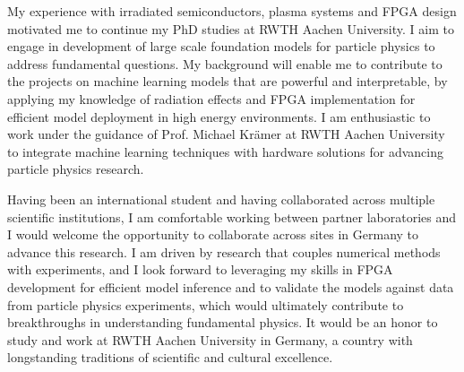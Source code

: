 \documentclass[a4paper,12pt]{article}
\begin{document}
\vspace{5pt}

My experience with irradiated semiconductors, plasma systems and FPGA design motivated me to continue my PhD studies at RWTH Aachen University. I aim to engage in development of large scale foundation models for particle physics to address fundamental questions. My background will enable me to contribute to the projects on machine learning models that are powerful and interpretable, by applying my knowledge of radiation effects and FPGA implementation for efficient model deployment in high energy environments. I am enthusiastic to work under the guidance of Prof. Michael Krämer at RWTH Aachen University to integrate machine learning techniques with hardware solutions for advancing particle physics research.

\vspace{5pt}

Having been an international student and having collaborated across multiple scientific institutions, I am comfortable working between partner laboratories and I would welcome the opportunity to collaborate across sites in Germany to advance this research. I am driven by research that couples numerical methods with experiments, and I look forward to leveraging my skills in FPGA development for efficient model inference and to validate the models against data from particle physics experiments, which would ultimately contribute to breakthroughs in understanding fundamental physics. It would be an honor to study and work at RWTH Aachen University in Germany, a country with longstanding traditions of scientific and cultural excellence.
\end{document}
